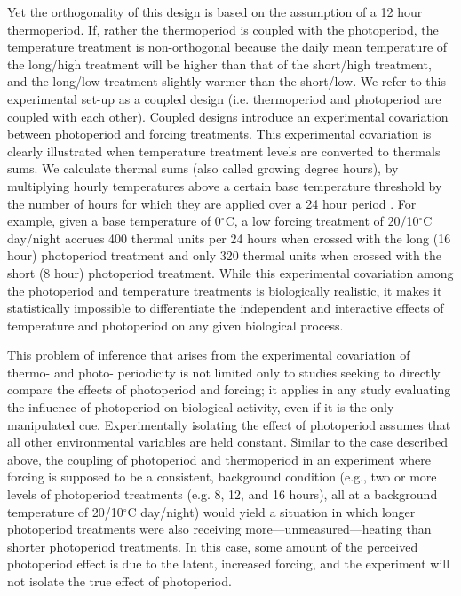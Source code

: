 \documentclass[11pt]{article}
\begin{document}
Yet the orthogonality of this design is based on the assumption of a 12 hour thermoperiod. If, rather the thermoperiod is coupled with the photoperiod, the temperature treatment is non-orthogonal because the daily mean temperature of the long/high treatment will be higher than that of the short/high treatment, and the long/low treatment slightly warmer than the short/low. We refer to this experimental set-up as a coupled design (i.e. thermoperiod and photoperiod are coupled with each other).  %
Coupled designs introduce an experimental covariation between photoperiod and forcing treatments. This experimental covariation is clearly illustrated when temperature treatment levels are converted to thermals sums. We calculate thermal sums (also called growing degree hours), by multiplying hourly temperatures above a certain base temperature threshold by the number of hours for which they are applied over a 24 hour period \citep{Parent:2019ug}. For example, given a base temperature of 0$^{\circ}$C, a low forcing treatment of 20/10$^{\circ}$C day/night accrues 400 thermal units per 24 hours  when crossed with the long (16 hour) photoperiod treatment and only 320 thermal units when crossed with the short (8 hour) photoperiod treatment. While this experimental covariation among the photoperiod and temperature treatments is biologically realistic, it makes it statistically impossible to differentiate the independent and interactive effects of temperature and photoperiod on any given biological process.

This problem of inference that arises from the experimental covariation of thermo- and photo- periodicity is not limited only to studies seeking to directly compare the effects of photoperiod and forcing; it applies in any study evaluating the influence of photoperiod on biological activity, even if it is the only manipulated cue. Experimentally isolating the effect of photoperiod assumes that all other environmental variables are held constant.  Similar to the case described above, %
the coupling of photoperiod and thermoperiod in an experiment where forcing is supposed to be a consistent, background condition (e.g., two or more levels of photoperiod treatments (e.g. 8, 12, and 16 hours), all at a background temperature of 20/10$^{\circ}$C day/night) would yield a situation in which longer photoperiod treatments were also receiving more---unmeasured---heating than shorter photoperiod treatments. In this case, some amount of the perceived photoperiod effect is due to the latent, increased forcing, and the experiment will not isolate the true effect of photoperiod.
\end{document}

